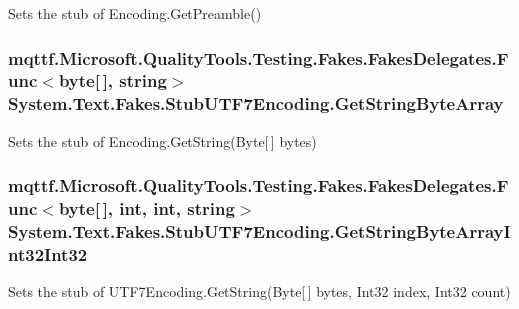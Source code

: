 Sets the stub of Encoding.\-Get\-Preamble()

\hypertarget{class_system_1_1_text_1_1_fakes_1_1_stub_u_t_f7_encoding_a128fc11b8db8888e59262a2e012de5a0}{
\subsubsection[{Get\-String\-Byte\-Array}]{\setlength{\rightskip}{0pt plus 5cm}mqttf.\-Microsoft.\-Quality\-Tools.\-Testing.\-Fakes.\-Fakes\-Delegates.\-Func$<$byte\mbox{[}$\,$\mbox{]}, string$>$ System.\-Text.\-Fakes.\-Stub\-U\-T\-F7\-Encoding.\-Get\-String\-Byte\-Array}}\label{class_system_1_1_text_1_1_fakes_1_1_stub_u_t_f7_encoding_a128fc11b8db8888e59262a2e012de5a0}


Sets the stub of Encoding.\-Get\-String(\-Byte\mbox{[}$\,$\mbox{]} bytes)

\hypertarget{class_system_1_1_text_1_1_fakes_1_1_stub_u_t_f7_encoding_a72382e363e6a0c80323714eba85a4447}{
\subsubsection[{Get\-String\-Byte\-Array\-Int32\-Int32}]{\setlength{\rightskip}{0pt plus 5cm}mqttf.\-Microsoft.\-Quality\-Tools.\-Testing.\-Fakes.\-Fakes\-Delegates.\-Func$<$byte\mbox{[}$\,$\mbox{]}, int, int, string$>$ System.\-Text.\-Fakes.\-Stub\-U\-T\-F7\-Encoding.\-Get\-String\-Byte\-Array\-Int32\-Int32}}\label{class_system_1_1_text_1_1_fakes_1_1_stub_u_t_f7_encoding_a72382e363e6a0c80323714eba85a4447}


Sets the stub of U\-T\-F7\-Encoding.\-Get\-String(\-Byte\mbox{[}$\,$\mbox{]} bytes, Int32 index, Int32 count)

